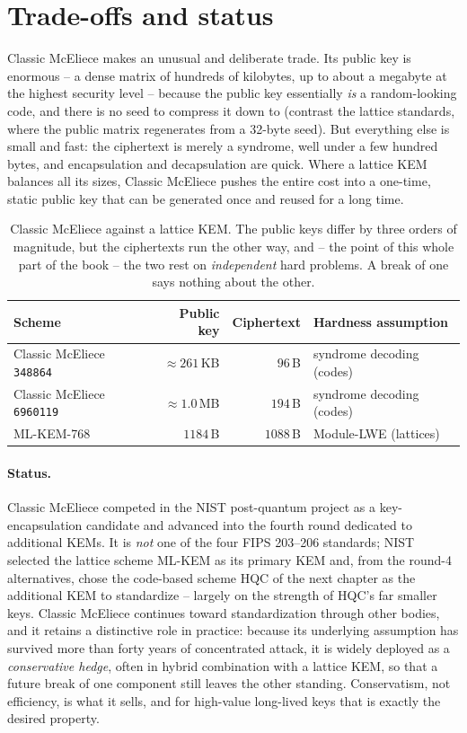 \section{Trade-offs and status}

Classic McEliece makes an unusual and deliberate trade. Its public key is enormous -- a dense matrix of hundreds of kilobytes, up to about a megabyte at the highest security level -- because the public key essentially \emph{is} a random-looking code, and there is no seed to compress it down to (contrast the lattice standards, where the public matrix regenerates from a 32-byte seed). But everything else is small and fast: the ciphertext is merely a syndrome, well under a few hundred bytes, and encapsulation and decapsulation are quick. Where a lattice KEM balances all its sizes, Classic McEliece pushes the entire cost into a one-time, static public key that can be generated once and reused for a long time.

\begin{table}[H]
\centering
\begin{tabular}{lrrl}
\toprule
Scheme & Public key & Ciphertext & Hardness assumption \\
\midrule
Classic McEliece \texttt{348864}  & $\approx 261$\,KB & $96$\,B  & syndrome decoding (codes) \\
Classic McEliece \texttt{6960119} & $\approx 1.0$\,MB & $194$\,B & syndrome decoding (codes) \\
ML-KEM-768                        & $1184$\,B          & $1088$\,B & Module-LWE (lattices) \\
\bottomrule
\end{tabular}
\caption{Classic McEliece against a lattice KEM. The public keys differ by three orders of magnitude, but the ciphertexts run the other way, and -- the point of this whole part of the book -- the two rest on \emph{independent} hard problems. A break of one says nothing about the other.}
\label{tab:mce-vs-mlkem}
\end{table}

\paragraph{Status.}
Classic McEliece competed in the NIST post-quantum project as a key-encapsulation candidate and advanced into the fourth round dedicated to additional KEMs. It is \emph{not} one of the four FIPS 203--206 standards; NIST selected the lattice scheme ML-KEM as its primary KEM and, from the round-4 alternatives, chose the code-based scheme HQC of the next chapter as the additional KEM to standardize -- largely on the strength of HQC's far smaller keys. Classic McEliece continues toward standardization through other bodies, and it retains a distinctive role in practice: because its underlying assumption has survived more than forty years of concentrated attack, it is widely deployed as a \emph{conservative hedge}, often in hybrid combination with a lattice KEM, so that a future break of one component still leaves the other standing. Conservatism, not efficiency, is what it sells, and for high-value long-lived keys that is exactly the desired property.

